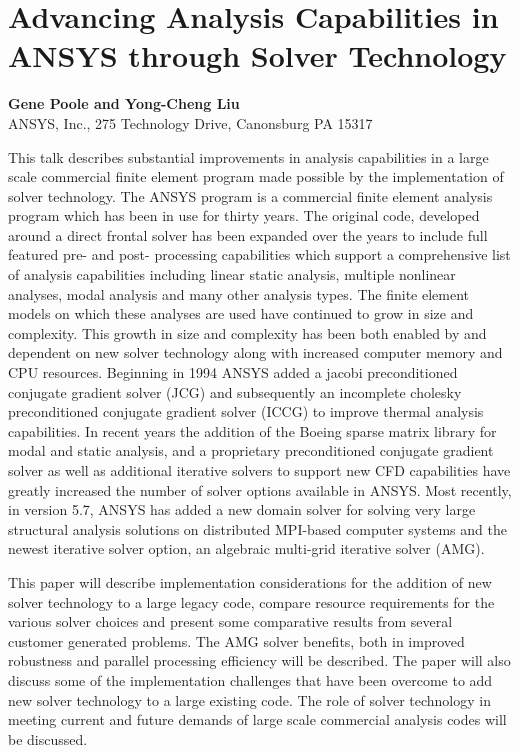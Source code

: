 \documentclass[11pt]{article}
\newcommand{\nextab}[4]{
	\section{#2}
	{\bf #1} \\ \nopagebreak
	{#3} \\ \nopagebreak
	{\tt #4} \nopagebreak
	}
\begin{document}
\nextab
{Gene Poole and Yong-Cheng Liu}
{Advancing Analysis Capabilities in ANSYS through Solver Technology}
{ANSYS, Inc., 275 Technology Drive, Canonsburg PA 15317}
{}

This talk describes substantial improvements in analysis
capabilities in a large scale commercial finite element program
made possible by the implementation of solver technology.  The
ANSYS program is a commercial finite element analysis program
which has been in use for thirty years.  The original code,
developed around a direct frontal solver has been expanded over
the years to include full featured pre- and post- processing
capabilities which support a comprehensive list of analysis
capabilities including linear static analysis, multiple
nonlinear analyses, modal analysis and many other analysis
types.  The finite element models on which these analyses are
used have continued to grow in size and complexity.  This growth
in size and complexity has been both enabled by and dependent on
new solver technology along with increased computer memory and
CPU resources.  Beginning in 1994 ANSYS added a jacobi
preconditioned conjugate gradient solver (JCG) and subsequently
an incomplete cholesky preconditioned conjugate gradient solver
(ICCG) to improve thermal analysis capabilities.  In recent
years the addition of the Boeing sparse matrix library for modal
and static analysis, and a proprietary preconditioned conjugate
gradient solver as well as additional iterative solvers to
support new CFD capabilities have greatly increased the number
of solver options available in ANSYS.  Most recently, in version
5.7, ANSYS has added a new domain solver for solving very large
structural analysis solutions on distributed MPI-based computer
systems and the newest iterative solver option, an algebraic
multi-grid iterative solver (AMG).

This paper will describe implementation considerations for the
addition of new solver technology to a large legacy code,
compare resource requirements for the various solver choices and
present some comparative results from several customer generated
problems.  The AMG solver benefits, both in improved robustness
and parallel processing efficiency will be described.  The paper
will also discuss some of the implementation challenges that
have been overcome to add new solver technology to a large
existing code.  The role of solver technology in meeting current
and future demands of large scale commercial analysis codes will
be discussed.


\end{document}
